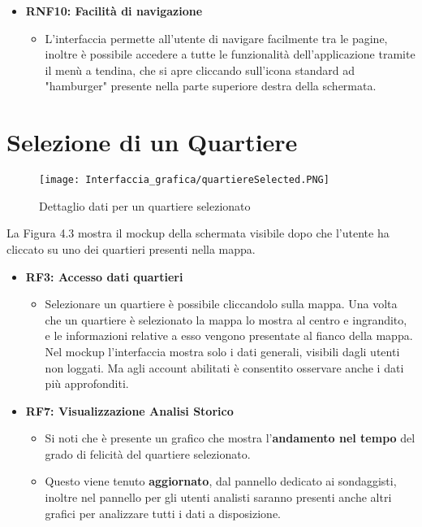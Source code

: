 \begin{itemize}
\begin{itemize}
        \end{itemize}
        \item \textbf{RNF10: Facilità di navigazione} \begin{itemize}
            \item L'interfaccia permette all'utente di navigare facilmente tra le pagine, inoltre è possibile accedere a tutte le funzionalità dell'applicazione tramite il menù a tendina, che si apre cliccando sull'icona standard ad "hamburger" presente nella parte superiore destra della schermata.
            \end{itemize}
    \end{itemize}
\newpage
\section{Selezione di un Quartiere}
    \begin{figure}[H]
        \center
        \texttt{[image: Interfaccia\_grafica/quartiereSelected.PNG]}
        \caption{Dettaglio dati per un quartiere selezionato}
    \end{figure}    

    La Figura 4.3 mostra il mockup della schermata visibile dopo che l'utente ha cliccato su uno dei quartieri presenti nella mappa.

    \begin{itemize}
        \item \textbf{RF3: Accesso dati quartieri} \begin{itemize}
            \item Selezionare un quartiere è possibile cliccandolo sulla mappa. Una volta che un quartiere è selezionato la mappa lo mostra al centro e ingrandito, e le informazioni relative a esso vengono presentate al fianco della mappa. Nel mockup l'interfaccia mostra solo i dati generali, visibili dagli utenti non loggati. Ma agli account abilitati è consentito osservare anche i dati più approfonditi.
        \end{itemize} 
        \item \textbf{RF7: Visualizzazione Analisi Storico} \begin{itemize}
            \item Si noti che è presente un grafico che mostra l'\textbf{andamento nel tempo} del grado di felicità del quartiere selezionato. 
            \item Questo viene tenuto \textbf{aggiornato}, dal pannello dedicato ai sondaggisti, inoltre nel pannello per gli utenti analisti saranno presenti anche altri grafici per analizzare tutti i dati a disposizione.
        \end{itemize}
    \end{itemize}
